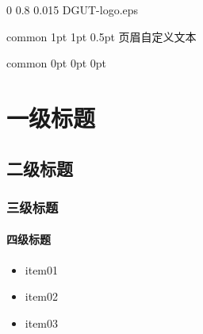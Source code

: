 \documentclass[
    report,     %
    oneside,    %
    UTF8,       %
    zihao=-4    %
]{config}
\begin{document}

\imageWatermark %
    {0} %
    {0.8} %
    {0.015} %
    {DGUT-logo.eps} %


\Header
    {common} %
    {1pt} %
    {1pt} %
    {0.5pt} %
    {页眉自定义文本} %
    {} %
    {\currentChapterInfo} %


\Footer
    {common} %
    {0pt} %
    {0pt} %
    {0pt} %
    {} %
    {\thepage} %
    {} %


\SetArabicPageNumber{} %


\chapter{一级标题}
\section{二级标题}
\subsection{三级标题}
\subsubsection{四级标题}

\begin{itemize}
    \item item01
    \item item02
    \item item03
\end{itemize}
\end{document}
